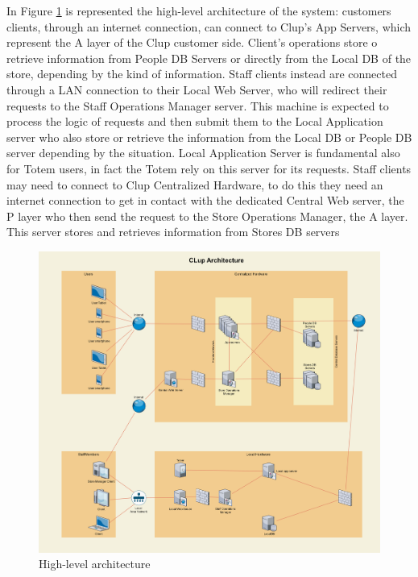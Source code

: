 In Figure \ref{fig:HLArch} is represented the high-level architecture of the system: customers clients, through an internet connection, can connect to Clup's App Servers, which represent the A layer of the Clup customer side. Client's operations store o retrieve information from People DB Servers or directly from the Local DB of the store, depending by the kind of information. Staff clients instead are connected through a LAN connection to their Local Web Server, who will redirect their requests to the Staff Operations Manager server. This machine is expected to process the logic of requests and then submit them to the Local Application server who also store or retrieve the information from the Local DB or People DB server depending by the situation. Local Application Server is fundamental also for Totem users, in fact the Totem rely on this server for its requests. Staff clients may need to connect to Clup Centralized Hardware, to do this they need an internet connection to get in contact with the dedicated Central Web server, the P layer who then send the request to the Store Operations Manager, the A layer. This server stores and retrieves information from Stores DB servers

\begin{figure}[h!]
	\includegraphics[width=\linewidth]{../Diagrams/Archtecture/Architecture_diagram.png}
	\caption{High-level architecture}
	\label{fig:HLArch}
\end{figure}
